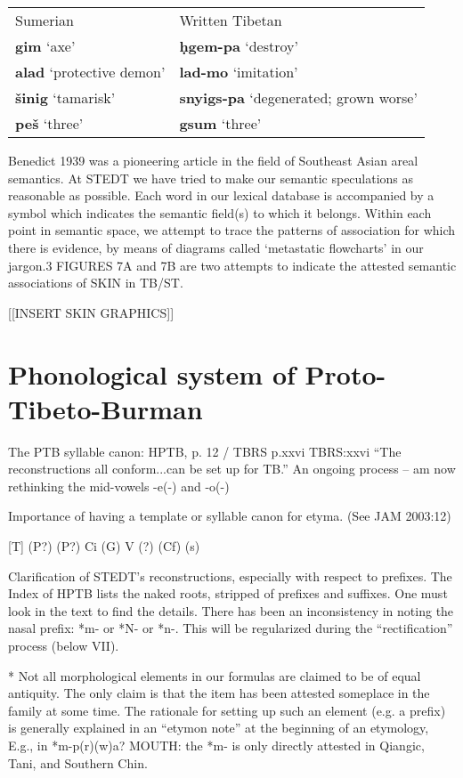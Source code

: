 \begin{tabular}{l l}
		Sumerian		&		Written Tibetan\\
		\textbf{gim} ‘axe’		&		\textbf{ḥgem-pa} ‘destroy’\\
		\textbf{alad} ‘protective demon’	&	\textbf{lad-mo} ‘imitation’\\
		\textbf{šinig} ‘tamarisk’	&		\textbf{snyigs-pa} ‘degenerated; grown worse’\\
		\textbf{peš} ‘three’	&		\textbf{gsum} ‘three’\\
\end{tabular}

Benedict 1939 was a pioneering article in the field of Southeast Asian areal semantics. At STEDT we have tried to make our semantic speculations as reasonable as possible. Each word in our lexical database is accompanied by a symbol which indicates the semantic field(s) to which it belongs. Within each point in semantic space, we attempt to trace the patterns of association for which there is evidence, by means of diagrams called ‘metastatic flowcharts’ in our jargon.3 FIGURES 7A and 7B are two attempts to indicate the attested semantic associations of SKIN in TB/ST.

[[INSERT SKIN GRAPHICS]]

\section{Phonological system of Proto-Tibeto-Burman}

	The PTB syllable canon: HPTB, p. 12 / TBRS p.xxvi
	TBRS:xxvi “The reconstructions all conform...can be set up for TB.”
	An ongoing process -- am now rethinking the mid-vowels -e(-) and -o(-)

Importance of having a template or syllable canon for etyma. (See JAM 2003:12)
		
					[T]
	(P?)	(P?)	Ci	(G)	V	(?)	(Cf)	(s)
	
Clarification of STEDT’s reconstructions, especially with respect to prefixes.
The Index of HPTB lists the naked roots, stripped of prefixes and suffixes. One must look in the text to find the details. There has been an inconsistency in noting the nasal prefix:  *m- or *N- or *n-. This will be regularized during the “rectification” process (below VII).

* Not all morphological elements in our formulas are claimed to be of equal antiquity. The only claim is that the item has been attested someplace in the family at some time.  The rationale for setting up such an element (e.g. a prefix) is generally explained in an “etymon note” at the beginning of an etymology, E.g., in *m-p(r)(w)a? MOUTH: the *m- is only directly attested in Qiangic, Tani, and Southern Chin.


